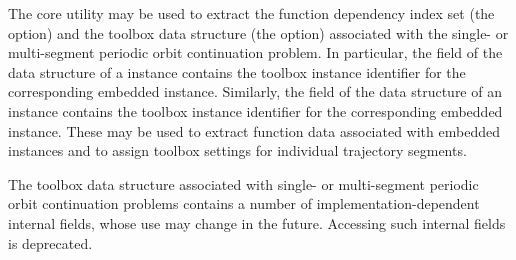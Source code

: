 The  core utility may be used to extract the function dependency index set (the  option) and the toolbox data structure (the  option) associated with the single- or multi-segment periodic orbit continuation problem. In particular, the  field of the data structure of a  instance contains the toolbox instance identifier for the corresponding embedded  instance. Similarly, the  field of the data structure of an  instance contains the toolbox instance identifier for the corresponding embedded  instance. These may be used to extract function data associated with embedded  instances and to assign  toolbox settings for individual trajectory segments.

The toolbox data structure associated with single- or multi-segment periodic orbit continuation problems contains a number of implementation-dependent internal fields, whose use may change in the future. Accessing such internal fields is deprecated.

